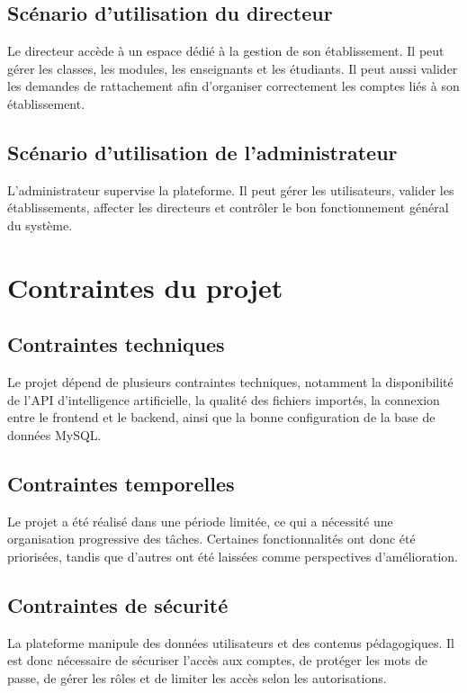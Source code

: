 \documentclass[12pt,a4paper]{report}
\begin{document}
\subsection{Scénario d'utilisation du directeur}

Le directeur accède à un espace dédié à la gestion de son établissement. Il peut
gérer les classes, les modules, les enseignants et les étudiants. Il peut aussi
valider les demandes de rattachement afin d'organiser correctement les comptes
liés à son établissement.

\subsection{Scénario d'utilisation de l'administrateur}

L'administrateur supervise la plateforme. Il peut gérer les utilisateurs,
valider les établissements, affecter les directeurs et contrôler le bon
fonctionnement général du système.

\section{Contraintes du projet}

\subsection{Contraintes techniques}

Le projet dépend de plusieurs contraintes techniques, notamment la disponibilité
de l'API d'intelligence artificielle, la qualité des fichiers importés, la
connexion entre le frontend et le backend, ainsi que la bonne configuration de
la base de données MySQL.

\subsection{Contraintes temporelles}

Le projet a été réalisé dans une période limitée, ce qui a nécessité une
organisation progressive des tâches. Certaines fonctionnalités ont donc été
priorisées, tandis que d'autres ont été laissées comme perspectives
d'amélioration.

\subsection{Contraintes de sécurité}

La plateforme manipule des données utilisateurs et des contenus pédagogiques.
Il est donc nécessaire de sécuriser l'accès aux comptes, de protéger les mots de
passe, de gérer les rôles et de limiter les accès selon les autorisations.
\end{document}
